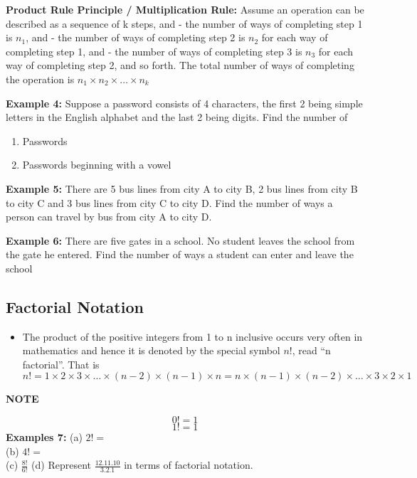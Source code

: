 \documentclass[]{book}
\providecommand{\tightlist}{%
  \setlength{\itemsep}{0pt}\setlength{\parskip}{0pt}}
\begin{document}
\textbf{Product Rule Principle / Multiplication Rule:} Assume an operation can be described as a sequence of k steps, and
- the number of ways of completing step 1 is \(n_1\), and
- the number of ways of completing step 2 is \(n_2\) for each way of completing step 1, and
- the number of ways of completing step 3 is \(n_3\) for each way of completing step 2, and so forth.
The total number of ways of completing the operation is \(n_1\times n_2 \times \dots \times n_k\)

\textbf{Example 4:} Suppose a password consists of 4 characters, the first 2 being simple letters in the English alphabet and the last 2 being digits. Find the number of

\begin{enumerate}
\def\labelenumi{(\alph{enumi})}
\item
  Passwords
\item
  Passwords beginning with a vowel
\end{enumerate}

\textbf{Example 5:} There are 5 bus lines from city A to city B, 2 bus lines from city B to city C and 3 bus lines from city C to city D. Find the number of ways a person can travel by bus from city A to city D.

\textbf{Example 6:} There are five gates in a school. No student leaves the school from the gate he entered. Find the number of ways a student can enter and leave the school

\hypertarget{factorial-notation}{%
\subsection{Factorial Notation}\label{factorial-notation}}

\begin{itemize}
\tightlist
\item
  The product of the positive integers from 1 to n inclusive occurs very often in mathematics and hence it is denoted by the special symbol \(n!\), read ``n factorial''. That is
  \[n! = 1\times2\times3\times \dots \times(n-2)\times(n-1)\times n = n\times (n-1)\times(n-2)\times\dots \times 3 \times 2 \times 1 \]
\end{itemize}

\textbf{NOTE}

\[0! = 1\]
\[1! = 1\]
\textbf{Examples 7:}
(a) \(2!=\)\\
(b) \(4!=\)\\
(c) \(\frac{8!}{6!}\)
(d) Represent \(\frac{12.11.10}{3.2.1}\) in terms of factorial notation.
\end{document}
